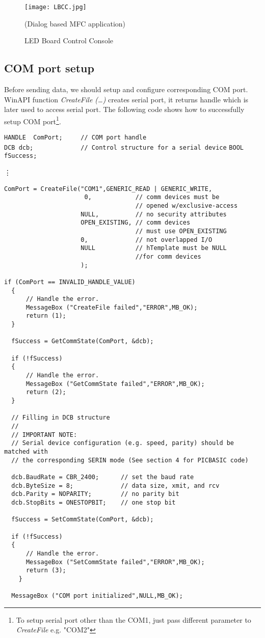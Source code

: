 \documentclass{article}
\begin{document}
\vspace*{0.1in}

\begin{figure}
\centering
\texttt{[image: LBCC.jpg]}
\caption{LED Board Control Console}{\hspace*{0.86in}(Dialog based
MFC application)} \label{fig:graph}
\end{figure}

\subsection{COM port setup}
Before sending data, we should setup and configure corresponding COM
port. WinAPI function \emph{CreateFile (\ldots)} creates serial
port, it returns handle which is later used to access serial port.
The following code shows how to successfully setup COM
port\footnote{To setup serial port other than the COM1, just pass
different parameter to \emph{CreateFile} e.g. "COM2"}.
\begin{flushleft}
\verb"HANDLE  ComPort;     // COM port handle"\\
\verb"DCB dcb;             // Control structure for a serial device"
\verb"BOOL fSuccess;"\\
\end{flushleft}
\vdots
\begin{verbatim}
ComPort = CreateFile("COM1",GENERIC_READ | GENERIC_WRITE,
                      0,            // comm devices must be
                                    // opened w/exclusive-access
                     NULL,          // no security attributes
                     OPEN_EXISTING, // comm devices
                                    // must use OPEN_EXISTING
                     0,             // not overlapped I/O
                     NULL           // hTemplate must be NULL
                                    //for comm devices
                     );

if (ComPort == INVALID_HANDLE_VALUE)
  {
      // Handle the error.
      MessageBox ("CreateFile failed","ERROR",MB_OK);
      return (1);
  }

  fSuccess = GetCommState(ComPort, &dcb);

  if (!fSuccess)
  {
      // Handle the error.
      MessageBox ("GetCommState failed","ERROR",MB_OK);
      return (2);
  }

  // Filling in DCB structure
  //
  // IMPORTANT NOTE:
  // Serial device configuration (e.g. speed, parity) should be matched with
  // the corresponding SERIN mode (See section 4 for PICBASIC code)

  dcb.BaudRate = CBR_2400;      // set the baud rate
  dcb.ByteSize = 8;             // data size, xmit, and rcv
  dcb.Parity = NOPARITY;        // no parity bit
  dcb.StopBits = ONESTOPBIT;    // one stop bit

  fSuccess = SetCommState(ComPort, &dcb);

  if (!fSuccess)
  {
      // Handle the error.
      MessageBox ("SetCommState failed","ERROR",MB_OK);
      return (3);
    }

  MessageBox ("COM port initialized",NULL,MB_OK);
\end{verbatim}
\end{document}
